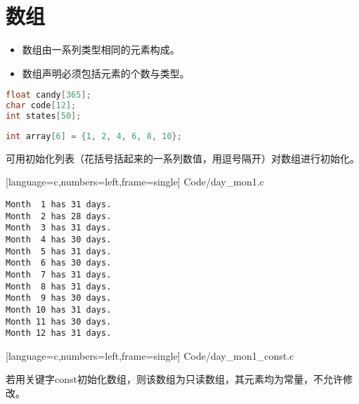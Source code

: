 \section{数组}

\begin{frame}[fragile]\ft{\secname}
\begin{itemize}
\item 数组由一系列类型相同的元素构成。\\[0.2in]
\item 数组声明必须包括元素的个数与类型。
\end{itemize}

\begin{lstlisting}[language=c,backgroundcolor=\color{red!20}]
float candy[365];
char code[12];
int states[50]; 
\end{lstlisting}

\end{frame}

\begin{frame}[fragile]
\begin{lstlisting}[language=c,backgroundcolor=\color{red!20}]
int array[6] = {1, 2, 4, 6, 8, 10};
\end{lstlisting}
可用初始化列表（花括号括起来的一系列数值，用逗号隔开）对数组进行初始化。
\end{frame}

\begin{frame}[fragile]
  
  [language=c,numbers=left,frame=single]
  {Code/day_mon1.c}
\end{frame}

\begin{frame}[fragile]
\begin{lstlisting}[backgroundcolor=\color{red!20}]
Month  1 has 31 days.
Month  2 has 28 days.
Month  3 has 31 days.
Month  4 has 30 days.
Month  5 has 31 days.
Month  6 has 30 days.
Month  7 has 31 days.
Month  8 has 31 days.
Month  9 has 30 days.
Month 10 has 31 days.
Month 11 has 30 days.
Month 12 has 31 days.
\end{lstlisting}
\end{frame}

\begin{frame}[fragile]

[language=c,numbers=left,frame=single]
{Code/day_mon1_const.c}
\end{frame}

\begin{frame}[fragile]
若用关键字{\tf const}初始化数组，则该数组为只读数组，其元素均为常量，不允许修改。
\end{frame}

